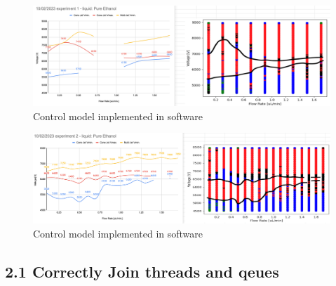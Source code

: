     \begin{figure}[H]
        \center
        \includegraphics[width=15cm]{images/image_folder_report_4/mapXman-1.png}
        \caption{Control model implemented in software}
    \end{figure}

    \begin{figure}[H]
        \center
        \includegraphics[width=15cm]{images/image_folder_report_4/mapXman-2.png}
        \caption{Control model implemented in software}
    \end{figure}



\subsection*{2.1 Correctly Join threads and qeues}
